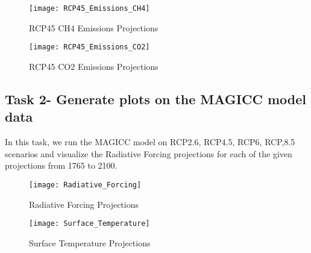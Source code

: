 \documentclass{article}
\begin{document}
\begin{figure}
    \texttt{[image: RCP45\_Emissions\_CH4]}
    \caption{RCP45 CH4 Emissions Projections}
\end{figure}

\begin{figure}
    \texttt{[image: RCP45\_Emissions\_CO2]}
    \caption{RCP45 CO2 Emissions Projections}
\end{figure}

\clearpage
\subsection{Task 2- Generate plots on the MAGICC model data}
In this task, we run the MAGICC model on RCP2.6, RCP4.5, RCP6, RCP,8.5 scenarios and visualize the Radiative Forcing projections for each of the given projections from 1765 to 2100.
\begin{figure}[H]
\texttt{[image: Radiative\_Forcing]}
\caption{Radiative Forcing Projections}
\end{figure}

\begin{figure}[H]
\texttt{[image: Surface\_Temperature]}
\caption{Surface Temperature Projections}
\end{figure}
    



\end{document}
